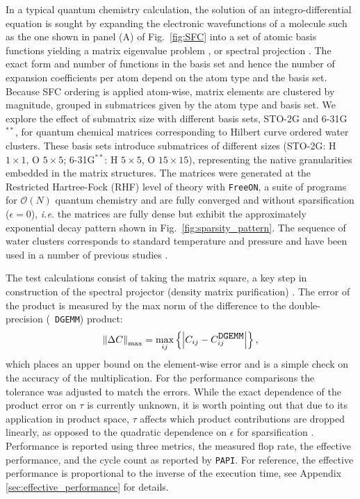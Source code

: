 In a typical quantum chemistry calculation, the solution of an
integro-differential equation is sought by expanding the electronic
wavefunctions of a molecule such as the one shown in panel (A) of
Fig.~\ref{fig:SFC} into a set of atomic basis functions yielding a matrix
eigenvalue problem \cite{szabo1996modern}, or spectral projection
\cite{McWeeny12061956, PhysRevB.58.12704, Challacombe:1999:DMM,
Challacombe:2000:SpMM, Benzi:2007:Decay, BenziDecay2012}.  The exact form and
number of functions in the basis set and hence the number of expansion
coefficients per atom depend on the atom type and the basis set.  Because SFC
ordering is applied atom-wise, matrix elements are clustered by magnitude,
grouped in submatrices given by the atom type and basis set. We explore the
effect of submatrix size with different basis sets, STO-2G and 6-31G${}^{**}$,
for quantum chemical matrices corresponding to Hilbert curve ordered water
clusters. These basis sets introduce submatrices of different sizes (STO-2G: H
$1 \times 1$, O $5 \times 5$; 6-31G${}^{**}$: H $5 \times 5$, O $15 \times
15$), representing the native granularities embedded in the matrix structures.
The matrices were generated at the Restricted Hartree-Fock (RHF) level of
theory with {\tt FreeON}, a suite of programs for $\mathcal{O} (N)$ quantum
chemistry \cite{FreeON} and are fully converged and without sparsification
($\epsilon = 0$), {\it i.e.} the matrices are fully dense but exhibit the
approximately exponential decay pattern shown in
Fig.~\ref{fig:sparsity_pattern}. The sequence of water clusters corresponds to
standard temperature and pressure and have been used in a number of previous
studies \cite{Challacombe:Review, Challacombe:1996:QCTCb,
Challacombe:1997:QCTC, burant:8969, ESchwegler97, millam:5569, daniels:425,
ochsenfeld:1663}.

The test calculations consist of taking the matrix square, a key step in
construction of the spectral projector (density matrix purification)
\cite{McWeeny12061956, PhysRevB.58.12704, Challacombe:1999:DMM,
Niklasson:2003:TRS4, Niklasson:2004:DMPT}.  The error of the product is
measured by the max norm of the difference to the double-precision ({\tt
DGEMM}) product:
\begin{equation}
\label{eq:matrix_error}
\left\| \Delta C \right\|_{\mathrm{max}} = \max_{ij} \left\{ \left| C_{ij} -
C^{\mbox{\tt DGEMM}}_{ij} \right| \right\},
\end{equation}
which places an upper bound on the element-wise error and is a simple check on
the accuracy of the multiplication. For the performance comparisons the
tolerance was adjusted to match the errors. While the exact dependence of the
product error on $\tau$ is currently unknown, it is worth pointing out that
due to its application in product space, $\tau$ affects which product
contributions are dropped linearly, as opposed to the quadratic dependence on
$\epsilon$ for sparsification \cite{ChallacombeBock2010}. Performance is
reported using three metrics, the measured flop rate, the effective
performance, and the cycle count as reported by {\tt PAPI}. For reference, the
effective performance is proportional to the inverse of the execution time,
see Appendix \ref{sec:effective_performance} for details.

